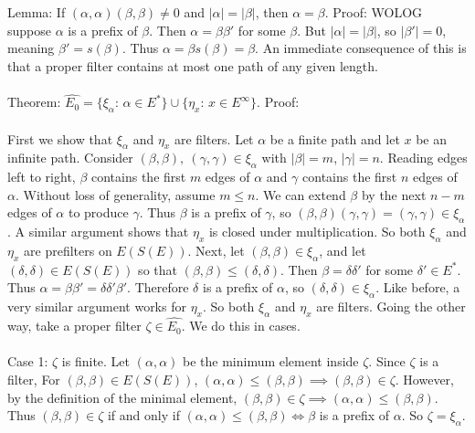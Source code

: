 \documentclass{article}
\begin{document}
Lemma: If $(\alpha, \alpha)(\beta, \beta) \neq 0$ and $|\alpha| = |\beta|$, then $\alpha = \beta$. Proof:
WOLOG suppose $\alpha$ is a prefix of $\beta$. Then $\alpha = \beta \beta'$ for some $\beta$. But
$|\alpha| = |\beta|$, so $|\beta'| = 0$, meaning $\beta' = s(\beta)$. Thus $\alpha = \beta s(\beta) = \beta$.
An immediate consequence of this is that a proper filter contains at most one path of any given length.
\\ \\
Theorem: $\hat{E_0} = \{\xi_\alpha\text{: } \alpha \in E^*\} \cup \{\eta_x\text{: } x \in E^\infty\}$. Proof:
\\ \\
First we show that $\xi_\alpha$ and $\eta_x$ are filters. Let $\alpha$ be a finite path and let $x$ be an infinite path.
Consider $(\beta, \beta), \ (\gamma, \gamma) \in \xi_\alpha$ with $|\beta| = m$, $|\gamma| = n$. 
Reading edges left to right, $\beta$ contains the first $m$ edges of $\alpha$ and $\gamma$ 
contains the first $n$ edges of $\alpha$. Without loss of generality, assume $m \leq n$. 
We can extend $\beta$ by the next $n - m$ edges of $\alpha$ to produce $\gamma$. Thus
$\beta$ is a prefix of $\gamma$, so $(\beta, \beta)(\gamma, \gamma) = (\gamma, \gamma) \in \xi_\alpha$.
A similar argument shows that $\eta_x$ is closed under multiplication. So both $\xi_\alpha$ and $\eta_x$ are prefilters
on $E(S(E))$. Next, let $(\beta, \beta) \in \xi_\alpha$, and let $(\delta, \delta) \in E(S(E))$ so that 
$(\beta, \beta) \leq (\delta, \delta)$. Then $\beta = \delta \delta'$ for some $\delta' \in E^*$. 
Thus $\alpha = \beta \beta' = \delta \delta' \beta'$. Therefore $\delta$ is a prefix of $\alpha$, so 
$(\delta, \delta) \in \xi_\alpha$. Like before, a very similar argument works for $\eta_x$. So both 
$\xi_\alpha$ and $\eta_x$ are filters. Going the other way, take a proper filter $\zeta \in \hat{E_0}$.
We do this in cases.
\\ \\
Case 1: $\zeta$ is finite.
Let $(\alpha, \alpha)$ be the minimum element inside $\zeta$. Since $\zeta$ is a filter,
For $(\beta, \beta) \in E(S(E))$, $(\alpha, \alpha) \leq (\beta, \beta) \implies (\beta, \beta) \in \zeta$.
However, by the definition of the minimal element, $(\beta, \beta) \in \zeta \implies (\alpha, \alpha) \leq (\beta, \beta)$.
Thus $(\beta, \beta) \in \zeta$ if and only if $(\alpha, \alpha) \leq (\beta, \beta) \iff \beta$ is a prefix of $\alpha$. So $\zeta = \xi_\alpha$.
\\ \\
\end{document}
